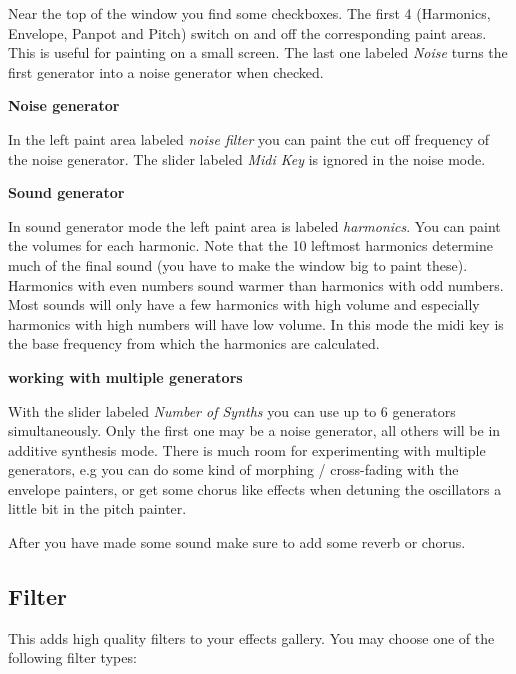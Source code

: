 \documentclass[letterpaper]{report}
\begin{document}
Near the top of the window you find some checkboxes. The first
4 (Harmonics, Envelope, Panpot and Pitch) switch on and off the
corresponding paint areas.  This is useful for painting on a small screen.
The last one labeled {\it Noise} turns the first generator into a noise
generator when checked.

{\bf Noise generator}

In the left paint area labeled {\it noise filter}  you can paint the
cut off frequency of the noise generator. The slider labeled {\it Midi Key}
is ignored in the noise mode.


{\bf Sound generator}

In sound generator mode the left paint area is labeled {\it harmonics}. You can
paint the volumes for each harmonic. Note that the 10 leftmost harmonics
determine much of the final sound (you have to make the window big to
paint these). Harmonics with even numbers sound warmer than harmonics
with odd numbers. Most sounds will only have a few harmonics with
high volume and especially harmonics with high numbers will have low
volume. In this mode the midi key is the base frequency from which the
harmonics are calculated.

{\bf working with multiple generators}

With the slider labeled {\it Number of Synths} you can use up to 6 generators
simultaneously. Only the first one may be a noise generator, all others will
be in additive synthesis mode. There is much room for experimenting with
multiple generators, e.g you can do some kind of morphing / cross-fading with
the envelope painters, or get some chorus like effects when detuning the
oscillators a little bit in the pitch painter.

After you have made some sound make sure to add some reverb or chorus.



\subsection{Filter}

This adds high quality filters to your effects gallery. You may choose
one of the following filter types:
\end{document}
